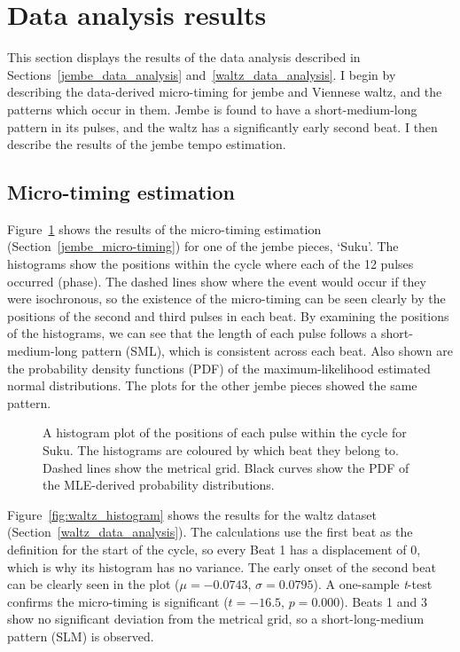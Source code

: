 \documentclass[12pt,twoside,openright]{report}
\begin{document}
\section{Data analysis results} \label{data_analysis_results}

This section displays the results of the data analysis described in Sections~\ref{jembe_data_analysis} and~\ref{waltz_data_analysis}. I
begin by describing the data-derived micro-timing for jembe and Viennese waltz,
and the patterns which occur in them. Jembe is found to have a short-medium-long
pattern in its pulses, and the waltz has a significantly early second beat. I
then describe the results of the jembe tempo estimation.


\subsection{Micro-timing estimation} \label{micro-timing_estimation_results}

Figure~\ref{fig:suku_histogram} shows the results of the micro-timing estimation (Section~\ref{jembe_micro-timing}) for one of
the jembe pieces, `Suku'. The histograms show the positions within the cycle
where each of the 12 pulses occurred (phase). The dashed lines show where the
event would occur if they were isochronous, so the existence of the micro-timing
can be seen clearly by the positions of the second and third pulses in each beat.
By examining the positions of the histograms, we can see that the length of each pulse follows a short-medium-long pattern (SML), which is consistent across
each beat. Also shown are the probability density functions (PDF) of the
maximum-likelihood estimated normal distributions. The plots for
the other jembe pieces showed the same pattern.

\begin{figure}[ht]
    \centering
    
    \caption{A histogram plot of the positions of each pulse within the cycle for Suku. The histograms are coloured by which beat they belong to. Dashed lines show the metrical grid. Black curves show the PDF of the MLE-derived probability distributions.}
    \label{fig:suku_histogram}
\end{figure}

Figure~\ref{fig:waltz_histogram} shows the results for the waltz dataset (Section~\ref{waltz_data_analysis}). The calculations
use the first beat as the definition for the start of the cycle, so every Beat 1
has a displacement of 0, which is why its histogram has no variance. The early onset
of the second beat can be clearly seen in the plot ($\mu=-0.0743$, $\sigma=0.0795$). A
one-sample \textit{t}-test confirms the micro-timing is significant ($t=-16.5$, $p=0.000$). Beats 1 and 3 show no significant deviation from the metrical grid, so a short-long-medium pattern (SLM) is observed.
\end{document}
